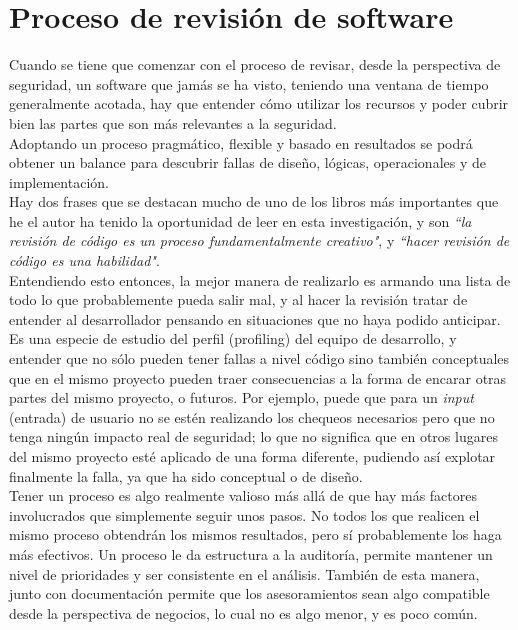 \section{Proceso de revisión de software}
Cuando se tiene que comenzar con el proceso de revisar, desde la perspectiva de seguridad, un software que jamás se ha visto, teniendo una ventana de tiempo generalmente acotada, hay que entender cómo utilizar los recursos y poder cubrir bien las partes que son más relevantes a la seguridad.\\

Adoptando un proceso pragmático, flexible y basado en resultados se podrá obtener un balance para descubrir fallas de diseño, lógicas, operacionales y de implementación.\\

Hay dos frases que se destacan mucho de uno de los libros más importantes que he el autor ha tenido la oportunidad de leer en esta investigación, y son \textit{``la revisión de código es un proceso fundamentalmente creativo"}, y \textit{``hacer revisión de código es una habilidad"}. \\

Entendiendo esto entonces, la mejor manera de realizarlo es armando una lista de todo lo que probablemente pueda salir mal, y al hacer la revisión tratar de entender al desarrollador pensando en situaciones que no haya podido anticipar. Es una especie de estudio del perfil (profiling) del equipo de desarrollo, y entender que no sólo pueden tener fallas a nivel código sino también conceptuales que en el mismo proyecto pueden traer consecuencias a la forma de encarar otras partes del mismo proyecto, o futuros. Por ejemplo, puede que para un \textit{input} (entrada) de usuario no se estén realizando los chequeos necesarios pero que no tenga ningún impacto real de seguridad; lo que no significa que en otros lugares del mismo proyecto esté aplicado de una forma diferente, pudiendo así explotar finalmente la falla, ya que ha sido conceptual o de diseño.\\

Tener un proceso es algo realmente valioso más allá de que hay más factores involucrados que simplemente seguir unos pasos. No todos los que realicen el mismo proceso obtendrán los mismos resultados, pero sí probablemente los haga más efectivos. Un proceso le da estructura a la auditoría, permite mantener un nivel de prioridades y ser consistente en el análisis. También de esta manera, junto con documentación permite que los asesoramientos sean algo compatible desde la perspectiva de negocios, lo cual no es algo menor, y es poco común.\\


